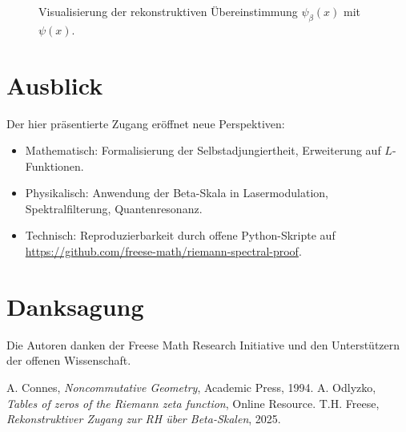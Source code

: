 \documentclass[11pt]{article}
\begin{document}
\begin{figure}[h]
    \centering
    \caption{Visualisierung der rekonstruktiven Übereinstimmung $\psi_\beta(x)$ mit $\psi(x)$.}
    \label{fig:psi}
\end{figure}

\section{Ausblick}

Der hier präsentierte Zugang eröffnet neue Perspektiven:
\begin{itemize}[topsep=1pt]
  \item Mathematisch: Formalisierung der Selbstadjungiertheit, Erweiterung auf $L$-Funktionen.
  \item Physikalisch: Anwendung der Beta-Skala in Lasermodulation, Spektralfilterung, Quantenresonanz.
  \item Technisch: Reproduzierbarkeit durch offene Python-Skripte auf \url{https://github.com/freese-math/riemann-spectral-proof}.
\end{itemize}

\section*{Danksagung}

Die Autoren danken der Freese Math Research Initiative und den Unterstützern der offenen Wissenschaft.


\begin{thebibliography}{9}
 A. Connes, \textit{Noncommutative Geometry}, Academic Press, 1994.
 A. Odlyzko, \textit{Tables of zeros of the Riemann zeta function}, Online Resource.
 T.H. Freese, \textit{Rekonstruktiver Zugang zur RH über Beta-Skalen}, 2025.
\end{thebibliography}
\end{document}
